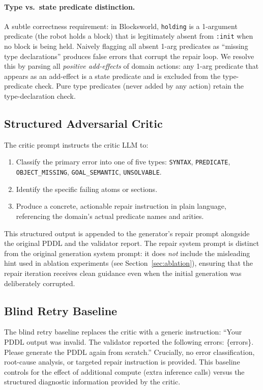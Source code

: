 \documentclass{article}
\begin{document}
\paragraph{Type vs.\ state predicate distinction.}
A subtle correctness requirement: in Blocksworld, \texttt{holding} is a 1-argument
predicate (the robot holds a block) that is legitimately absent from \texttt{:init}
when no block is being held.  Naively flagging all absent 1-arg predicates as
``missing type declarations'' produces false errors that corrupt the repair loop.
We resolve this by parsing all \emph{positive add-effects} of domain actions: any
1-arg predicate that appears as an add-effect is a state predicate and is excluded
from the type-predicate check.  Pure type predicates (never added by any action)
retain the type-declaration check.

\subsection{Structured Adversarial Critic}
\label{sec:critic}

The critic prompt instructs the critic LLM to:
\begin{enumerate}[leftmargin=1.5em]
  \item Classify the primary error into one of five types:
        \texttt{SYNTAX}, \texttt{PREDICATE}, \texttt{OBJECT\_MISSING},
        \texttt{GOAL\_SEMANTIC}, \texttt{UNSOLVABLE}.
  \item Identify the specific failing atoms or sections.
  \item Produce a concrete, actionable repair instruction in plain language, referencing
        the domain's actual predicate names and arities.
\end{enumerate}

This structured output is appended to the generator's repair prompt alongside the
original PDDL and the validator report.  The repair system prompt is distinct from
the original generation system prompt: it does \emph{not} include the misleading
hint used in ablation experiments (see Section~\ref{sec:ablation}), ensuring that
the repair iteration receives clean guidance even when the initial generation was
deliberately corrupted.

\subsection{Blind Retry Baseline}
\label{sec:blind}

The blind retry baseline replaces the critic with a generic instruction: ``Your PDDL
output was invalid.  The validator reported the following errors: \{errors\}.  Please
generate the PDDL again from scratch.''  Crucially, no error classification, root-cause
analysis, or targeted repair instruction is provided.  This baseline controls for the
effect of additional compute (extra inference calls) versus the structured diagnostic
information provided by the critic.
\end{document}

